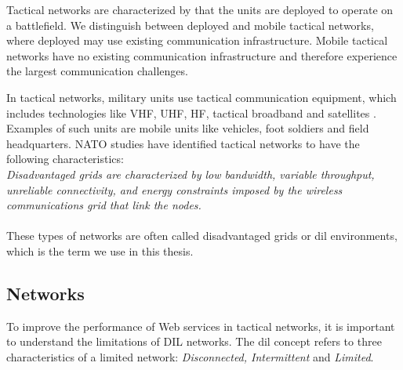 Tactical networks are characterized by that the units are deployed to operate on
a battlefield. We distinguish between deployed and mobile tactical networks,
where deployed may use existing communication infrastructure. Mobile tactical
networks have no existing communication infrastructure and therefore experience
the largest communication challenges.

 In tactical networks, military units use tactical communication equipment, which
 includes technologies like VHF, UHF, HF, tactical broadband and satellites
 \cite{ist-090}. Examples of such units are mobile units like vehicles, foot
 soldiers and field headquarters. NATO studies\cite{nato-disadvantaged-grids}
 have identified tactical networks to have the following characteristics: \\

\textit{
Disadvantaged grids are characterized by low bandwidth, variable throughput,
unreliable connectivity, and energy constraints imposed by the wireless
communications grid that link the nodes.
}

\paragraph{}

These types of networks are often called disadvantaged grids or \gls{dil}
environments, which is the term we use in this thesis.

\subsection{ Networks}
\label{dil}

To improve the performance of Web services in tactical networks, it is important
to understand the limitations of DIL networks. The \gls{dil} concept refers to
three characteristics of a limited network: \textit{Disconnected, Intermittent}
and \textit{Limited}.


